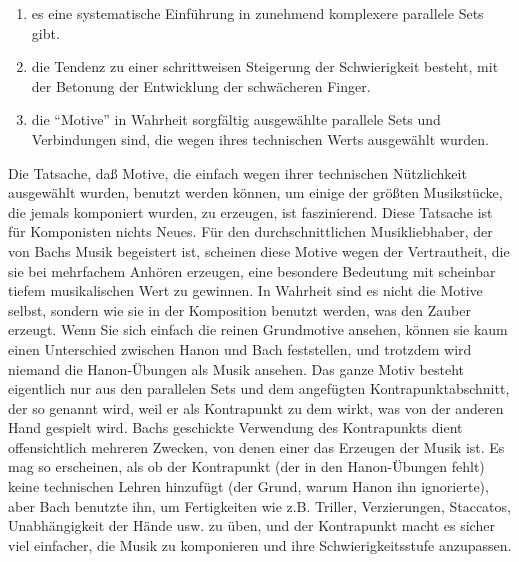 \begin{enumerate}[label={\roman*.}] 
\item es eine systematische Einführung in zunehmend komplexere parallele Sets gibt.
\item die Tendenz zu einer schrittweisen Steigerung der Schwierigkeit besteht, mit der Betonung der Entwicklung der schwächeren Finger.
\item die \enquote{Motive} in Wahrheit sorgfältig ausgewählte parallele Sets und Verbindungen sind, die wegen ihres technischen Werts ausgewählt wurden.

\end{enumerate}
Die Tatsache, daß Motive, die einfach wegen ihrer technischen Nützlichkeit ausgewählt wurden, benutzt werden können, um einige der größten Musikstücke, die jemals komponiert wurden, zu erzeugen, ist faszinierend.
Diese Tatsache ist für Komponisten nichts Neues.
Für den durchschnittlichen Musikliebhaber, der von Bachs Musik begeistert ist, scheinen diese Motive wegen der Vertrautheit, die sie  bei mehrfachem Anhören erzeugen, eine besondere Bedeutung mit scheinbar tiefem musikalischen Wert zu gewinnen.
In Wahrheit sind es nicht die Motive selbst, sondern wie sie in der Komposition benutzt werden, was den Zauber erzeugt.
Wenn Sie sich einfach die reinen Grundmotive ansehen, können sie kaum einen Unterschied zwischen Hanon und Bach feststellen, und trotzdem wird niemand die Hanon-Übungen als Musik ansehen.
Das ganze Motiv besteht eigentlich nur aus den parallelen Sets und dem angefügten Kontrapunktabschnitt, der so genannt wird, weil er als Kontrapunkt zu dem wirkt, was von der anderen Hand gespielt wird.
Bachs geschickte Verwendung des Kontrapunkts dient offensichtlich mehreren Zwecken, von denen einer das Erzeugen der Musik ist.
Es mag so erscheinen, als ob der Kontrapunkt (der in den Hanon-Übungen fehlt) keine technischen Lehren hinzufügt (der Grund, warum Hanon ihn ignorierte), aber Bach benutzte ihn, um Fertigkeiten wie z.B. Triller, Verzierungen, Staccatos, Unabhängigkeit der Hände usw. zu üben, und der Kontrapunkt macht es sicher viel einfacher, die Musik zu komponieren und ihre Schwierigkeitsstufe anzupassen.

